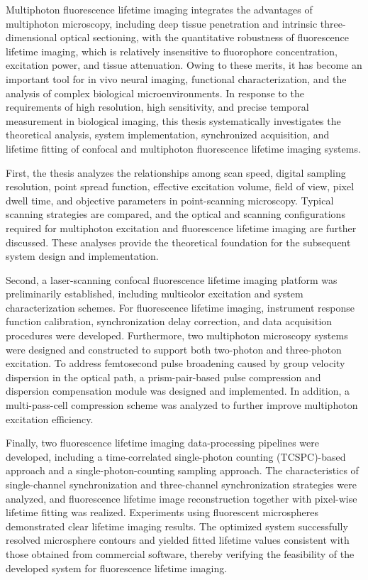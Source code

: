 Multiphoton fluorescence lifetime imaging integrates the advantages of multiphoton microscopy, including deep tissue penetration and intrinsic three-dimensional optical sectioning, with the quantitative robustness of fluorescence lifetime imaging, which is relatively insensitive to fluorophore concentration, excitation power, and tissue attenuation. Owing to these merits, it has become an important tool for in vivo neural imaging, functional characterization, and the analysis of complex biological microenvironments. In response to the requirements of high resolution, high sensitivity, and precise temporal measurement in biological imaging, this thesis systematically investigates the theoretical analysis, system implementation, synchronized acquisition, and lifetime fitting of confocal and multiphoton fluorescence lifetime imaging systems.

First, the thesis analyzes the relationships among scan speed, digital sampling resolution, point spread function, effective excitation volume, field of view, pixel dwell time, and objective parameters in point-scanning microscopy. Typical scanning strategies are compared, and the optical and scanning configurations required for multiphoton excitation and fluorescence lifetime imaging are further discussed. These analyses provide the theoretical foundation for the subsequent system design and implementation.

Second, a laser-scanning confocal fluorescence lifetime imaging platform was preliminarily established, including multicolor excitation and system characterization schemes. For fluorescence lifetime imaging, instrument response function calibration, synchronization delay correction, and data acquisition procedures were developed. Furthermore, two multiphoton microscopy systems were designed and constructed to support both two-photon and three-photon excitation. To address femtosecond pulse broadening caused by group velocity dispersion in the optical path, a prism-pair-based pulse compression and dispersion compensation module was designed and implemented. In addition, a multi-pass-cell compression scheme was analyzed to further improve multiphoton excitation efficiency.

Finally, two fluorescence lifetime imaging data-processing pipelines were developed, including a time-correlated single-photon counting (TCSPC)-based approach and a single-photon-counting sampling approach. The characteristics of single-channel synchronization and three-channel synchronization strategies were analyzed, and fluorescence lifetime image reconstruction together with pixel-wise lifetime fitting was realized. Experiments using fluorescent microspheres demonstrated clear lifetime imaging results. The optimized system successfully resolved microsphere contours and yielded fitted lifetime values consistent with those obtained from commercial software, thereby verifying the feasibility of the developed system for fluorescence lifetime imaging.

